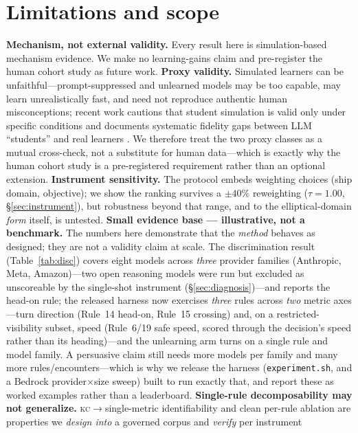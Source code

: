 \documentclass{article}
\newcommand{\kc}{\textsc{kc}}
\begin{document}
\section{Limitations and scope}
\label{sec:limits}
\textbf{Mechanism, not external validity.} Every result here is simulation-based mechanism
evidence. We make no learning-gains claim and pre-register the human cohort study as future
work. \textbf{Proxy validity.} Simulated learners can be unfaithful---prompt-suppressed and
unlearned models may be too capable, may learn unrealistically fast, and need not reproduce
authentic human misconceptions; recent work cautions that student simulation is valid only
under specific conditions \citep{validsim2026} and documents systematic fidelity gaps
between LLM ``students'' and real learners \citep{studentfidelity2025, studentabilities2025}. We
therefore treat the two proxy classes as a mutual cross-check, not a substitute for human
data---which is exactly why the human cohort study is a pre-registered requirement rather
than an optional extension. \textbf{Instrument sensitivity.} The protocol embeds weighting
choices (ship domain, objective); we show the ranking survives a $\pm40\%$ reweighting
($\tau=1.00$, \S\ref{sec:instrument}), but robustness beyond that range, and to the
elliptical-domain \emph{form} itself, is untested. \textbf{Small evidence base --- illustrative, not a benchmark.}
The numbers here demonstrate that the \emph{method} behaves as designed; they are not a
validity claim at scale. The discrimination result (Table~\ref{tab:disc}) covers eight models across
\emph{three} provider families (Anthropic, Meta, Amazon)---two open reasoning models were run but
excluded as unscoreable by the single-shot instrument (\S\ref{sec:diagnosis})---and reports the head-on rule; the
released harness now exercises \emph{three} rules across \emph{two} metric axes---turn direction
(Rule~14 head-on, Rule~15 crossing) and, on a restricted-visibility subset, speed (Rule~6/19 safe
speed, scored through the decision's speed rather than its heading)---and the unlearning arm turns on a
single rule and model family. A persuasive claim still needs more models per family and many
more rules/encounters---which is why we release the harness (\texttt{experiment.sh}, and a
Bedrock provider$\times$size sweep) built to run exactly that, and report these as worked
examples rather than a leaderboard. \textbf{Single-rule decomposability may not generalize.}
\kc$\to$single-metric identifiability and clean per-rule ablation are properties we
\emph{design into} a governed corpus and \emph{verify} per instrument
\end{document}
